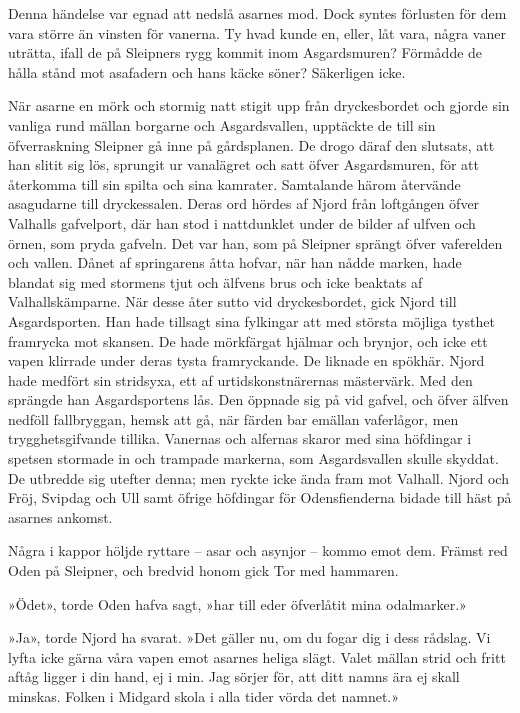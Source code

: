 Denna händelse var egnad att nedslå asarnes mod. Dock syntes förlusten
för dem vara större än vinsten för vanerna. Ty hvad kunde en, eller, låt
vara, några vaner uträtta, ifall de på Sleipners rygg kommit inom
Asgardsmuren? Förmådde de hålla stånd mot asafadern och hans käcke
söner? Säkerligen icke.

När asarne en mörk och stormig natt stigit upp från dryckesbordet och
gjorde sin vanliga rund mällan borgarne och Asgardsvallen, upptäckte de
till sin öfverraskning
Sleipner
gå inne på gårdsplanen. De drogo däraf den slutsats, att han slitit sig
lös, sprungit ur vanalägret och satt öfver Asgardsmuren, för att
återkomma till sin spilta och sina kamrater. Samtalande härom återvände
asagudarne till dryckessalen. Deras ord hördes af Njord från loftgången
öfver Valhalls gafvelport, där han stod i nattdunklet under de bilder af
ulfven och örnen, som pryda gafveln. Det var han, som på Sleipner
sprängt öfver vaferelden och vallen. Dånet af springarens åtta hofvar,
när han nådde marken, hade blandat sig med stormens tjut och älfvens
brus och icke beaktats af Valhallskämparne. När desse åter sutto vid
dryckesbordet, gick Njord till Asgardsporten. Han hade tillsagt sina
fylkingar att med största möjliga tysthet framrycka mot skansen. De hade
mörkfärgat hjälmar och brynjor, och icke ett vapen klirrade under deras
tysta framryckande. De liknade en spökhär. Njord hade medfört sin
stridsyxa, ett af urtidskonstnärernas mästervärk. Med den sprängde han
Asgardsportens lås. Den öppnade sig på vid gafvel, och öfver älfven
nedföll fallbryggan, hemsk att gå, när färden bar emällan vaferlågor,
men trygghetsgifvande tillika. Vanernas och alfernas skaror med sina
höfdingar i spetsen stormade in och trampade markerna, som Asgardsvallen
skulle skyddat. De utbredde sig utefter denna; men ryckte icke ända fram
mot Valhall. Njord och Fröj, Svipdag och Ull samt öfrige höfdingar för
Odensfienderna bidade till häst på asarnes ankomst.

Några i kappor höljde ryttare -- asar och asynjor -- kommo emot dem.
Främst red Oden på Sleipner, och bredvid honom gick Tor med hammaren.

»Ödet», torde Oden hafva sagt, »har till eder öfverlåtit mina
odalmarker.»

»Ja», torde Njord ha svarat. »Det gäller nu, om du fogar dig i dess
rådslag. Vi lyfta icke gärna våra vapen emot asarnes heliga slägt. Valet
mällan strid och fritt aftåg ligger i din hand, ej i min. Jag sörjer
för, att ditt namns ära ej skall minskas. Folken i Midgard skola i alla
tider vörda det namnet.»


